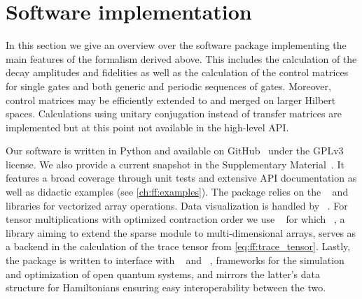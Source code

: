 \chapter{Software implementation}\label{ch:ff:software}
In this section we give an overview over the \filterfunctions software package implementing the main features of the formalism derived above.
This includes the calculation of the decay amplitudes \decayamps and fidelities as well as the calculation of the control matrices for single gates and both generic and periodic sequences of gates.
Moreover, control matrices may be efficiently extended to and merged on larger Hilbert spaces.
Calculations using unitary conjugation instead of transfer matrices are implemented but at this point not available in the high-level API.

Our software is written in Python and available on GitHub~\cite{Hangleiter_ff} under the GPLv3 license.
We also provide a current snapshot in the Supplementary Material~\cite{prrSupp}.
It features a broad coverage through unit tests and extensive API documentation as well as didactic examples (see \cref{ch:ff:examples}).
The package relies on the \numpy~\cite{Harris2020} and \scipy~\cite{Virtanen2020} libraries for vectorized array operations.
Data visualization is handled by \matplotlib~\cite{Hunter2007}.
For tensor multiplications with optimized contraction order we use \opteinsum~\cite{Smith2018} for which \sparse~\cite{Pydata2019}, a library aiming to extend the \scipy sparse module to multi-dimensional arrays, serves as a backend in the calculation of the trace tensor from \cref{eq:ff:trace_tensor}.
Lastly, the package is written to interface with \qopt~\cite{Teske2021,Teske2022} and \qutip~\cite{Johansson2012}, frameworks for the simulation and optimization of open quantum systems, and mirrors the latter's data structure for Hamiltonians ensuring easy interoperability between the two.

